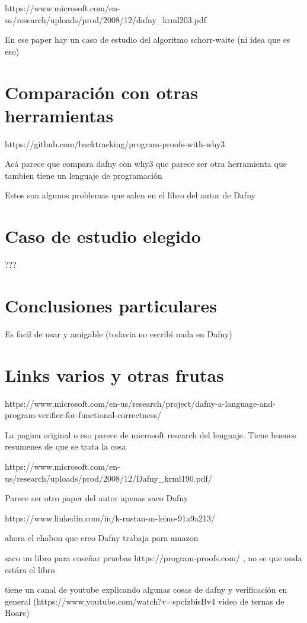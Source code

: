 \documentclass[runningheads]{llncs}
\begin{document}
https://www.microsoft.com/en-us/research/uploads/prod/2008/12/dafny\_krml203.pdf

En ese paper hay un caso de estudio del algoritmo schorr-waite (ni idea que es eso)

\section{Comparación con otras herramientas}
https://github.com/backtracking/program-proofs-with-why3

Acá parece que compara dafny con why3 que parece ser otra herramienta que tambien tiene un lenguaje de programación

Estos son algunos problemas que salen en el libro del autor de Dafny

\section{Caso de estudio elegido}
???

\section{Conclusiones particulares}
Es facil de usar y amigable (todavia no escribi nada en Dafny)

\section{Links varios y otras frutas}
https://www.microsoft.com/en-us/research/project/dafny-a-language-and-program-verifier-for-functional-correctness/

La pagina original o eso parece de microsoft research del lenguaje. Tiene buenos resumenes de que se trata la cosa

https://www.microsoft.com/en-us/research/uploads/prod/2008/12/Dafny\_krml190.pdf/

Parece ser otro paper del autor apenas saco Dafny

https://www.linkedin.com/in/k-rustan-m-leino-91a9a213/

ahora el chabon que creo Dafny trabaja para amazon

saco un libro para enseñar pruebas https://program-proofs.com/ , no se que onda estára el libro

tiene un canal de youtube explicando algunas cosas de dafny y verificación en general (https://www.youtube.com/watch?v=spcfzbisBv4 video de ternas de Hoare)
\end{document}
